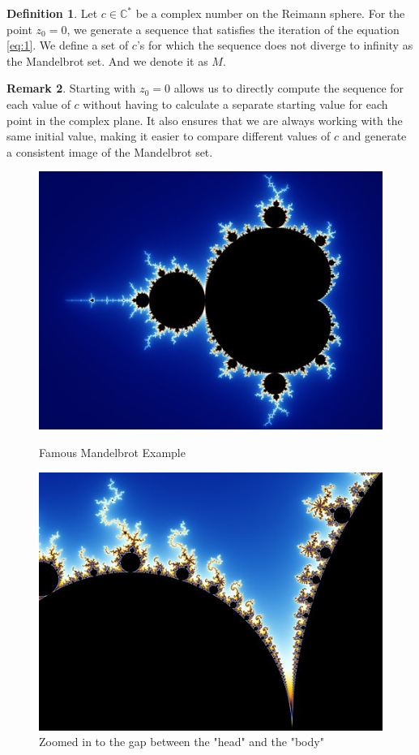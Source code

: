 \documentclass[a4paper,11pt]{article}
\theoremstyle{definition}
\newtheorem{defn}{Definition}[section] %
\newtheorem{remark}[defn]{Remark}
\numberwithin{equation}{section} %
\begin{document}
\begin{defn}
    Let $c \in \mathbb{C}^{*}$ be a complex number on the Reimann sphere. For the point $z_0 = 0$, we generate a sequence that satisfies the iteration of the equation \ref{eq:1}. We define a set of $c$'s for which the sequence does not diverge to infinity as the Mandelbrot set. And we denote it as $M$.
\end{defn}


\begin{remark}
    Starting with $z_0 = 0$ allows us to directly compute the sequence for each value of $c$ without having to calculate a separate starting value for each point in the complex plane. It also ensures that we are always working with the same initial value, making it easier to compare different values of $c$ and generate a consistent image of the Mandelbrot set.
\end{remark}

\begin{figure}[h]
    \centering
    \begin{minipage}{.5\textwidth}
        \centering
        \includegraphics[width=.5\linewidth]{figures/mandelbrot_example_1.jpeg}
        \caption[width=.2\textwidth]{Famous Mandelbrot Example \cite{mandelbrot-sets-examples}}
        \label{fig:Mandelbrot_ex_1}
    \end{minipage}%
    \begin{minipage}{.5\textwidth}
        \centering
        \includegraphics[width=.5\linewidth]{figures/mandelbrot_example_1_zommed_in.jpeg}
        \caption[width=.2\textwidth]{Zoomed in to the gap between the "head" and the "body" \cite{mandelbrot-sets-examples}}
        \label{fig:Mandelbrot_ex_2}
    \end{minipage}
\end{figure}
\end{document}
